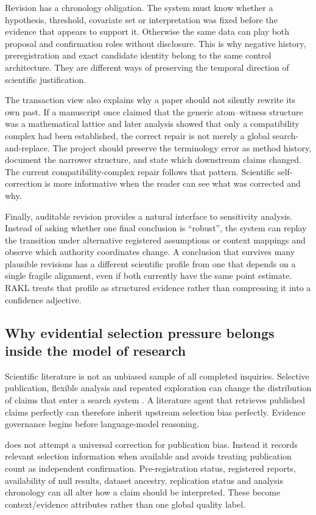 Revision has a chronology obligation. The system must know whether a hypothesis, threshold, covariate set or interpretation was fixed before the evidence that appears to support it. Otherwise the same data can play both proposal and confirmation roles without disclosure. This is why negative history, preregistration and exact candidate identity belong to the same control architecture. They are different ways of preserving the temporal direction of scientific justification.

The transaction view also explains why a paper should not silently rewrite its own past. If a manuscript once claimed that the generic atom--witness structure was a mathematical lattice and later analysis showed that only a compatibility complex had been established, the correct repair is not merely a global search-and-replace. The project should preserve the terminology error as method history, document the narrower structure, and state which downstream claims changed. The current compatibility-complex repair follows that pattern. Scientific self-correction is more informative when the reader can see what was corrected and why.

Finally, auditable revision provides a natural interface to sensitivity analysis. Instead of asking whether one final conclusion is ``robust'', the system can replay the transition under alternative registered assumptions or context mappings and observe which authority coordinates change. A conclusion that survives many plausible revisions has a different scientific profile from one that depends on a single fragile alignment, even if both currently have the same point estimate. RAKL treats that profile as structured evidence rather than compressing it into a confidence adjective.

\subsection{Why evidential selection pressure belongs inside the model of research}

Scientific literature is not an unbiased sample of all completed inquiries. Selective publication, flexible analysis and repeated exploration can change the distribution of claims that enter a search system \cite{rosenthal1979,franco2014,ioannidis2005}. A literature agent that retrieves published claims perfectly can therefore inherit upstream selection bias perfectly. Evidence governance begins before language-model reasoning.

\RAKL{} does not attempt a universal correction for publication bias. Instead it records relevant selection information when available and avoids treating publication count as independent confirmation. Pre-registration status, registered reports, availability of null results, dataset ancestry, replication status and analysis chronology can all alter how a claim should be interpreted. These become context/evidence attributes rather than one global quality label.

